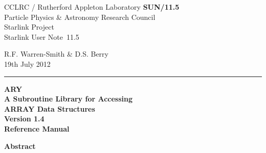 \documentclass[twoside,11pt]{article}
\newcommand{\stardoccategory}  {Starlink User Note}
\newcommand{\stardocinitials}  {SUN}
\newcommand{\stardocnumber}    {11.5}
\newcommand{\stardocauthors}   {R.F. Warren-Smith \& D.S. Berry}
\newcommand{\stardocdate}      {19th July 2012}
\newcommand{\stardoctitle}     {ARY\\[\latex{2.5ex}]
                                A Subroutine Library for Accessing\\
                                ARRAY Data Structures}
\newcommand{\stardocversion}   {Version 1.4}
\newcommand{\stardocmanual}    {Reference Manual}
\newcommand{\stardocname}{\stardocinitials /\stardocnumber}
\newenvironment{latexonly}{}{}
\newcommand{\latex}[1]{#1}
\begin{document}
\thispagestyle{empty}

\begin{latexonly}
   CCLRC / {\sc Rutherford Appleton Laboratory} \hfill {\bf \stardocname}\\
   {\large Particle Physics \& Astronomy Research Council}\\
   {\large Starlink Project\\}
   {\large \stardoccategory\ \stardocnumber}
   \begin{flushright}
   \stardocauthors\\
   \stardocdate
   \end{flushright}
   \vspace{-4mm}
   \rule{\textwidth}{0.5mm}
   \vspace{5mm}
   \begin{center}
   {\Huge\bf  \stardoctitle \\ [2.5ex]}
   {\LARGE\bf \stardocversion \\ [4ex]}
   {\Huge\bf  \stardocmanual}
   \end{center}
   \vspace{5mm}


   \vspace{10mm}
   \begin{center}
      {\Large\bf Abstract}
   \end{center}
\end{latexonly}
\end{document}
